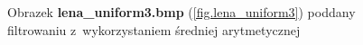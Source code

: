 \documentclass{classrep}
\begin{document}
\begin{figure}
{{  \label{fig.lena_uniform3_average_5x5}
 }
}
\caption{Obrazek \textbf{lena\_uniform3.bmp} (\ref{fig.lena_uniform3}) poddany filtrowaniu z~wykorzystaniem średniej arytmetycznej}
\label{fig.lena_uniform3_average}
\end{figure}
\end{document}

